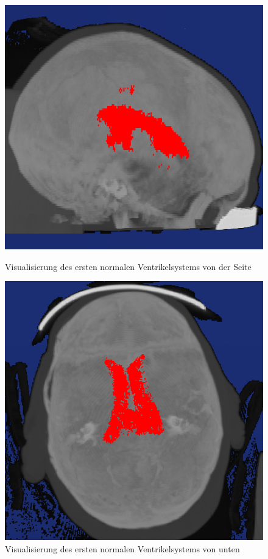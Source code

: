 \begin{figure}[H]
\begin{minipage}[b]{.5\textwidth}
  \centering
  \includegraphics[width=.9\linewidth, height=.9\linewidth]{Logos/Normal1/Seite2.PNG}
  \caption{Visualisierung des ersten normalen Ventrikelsystems von der Seite}
  \label{fig:norm1_s}
\end{minipage}%
\begin{minipage}[b]{.5\textwidth}
  \centering
  \includegraphics[width=.9\linewidth, height=.9\linewidth]{Logos/Normal1/Unten3.PNG}
  \caption{Visualisierung des ersten normalen Ventrikelsystems von unten}
  \label{fig:norm1_u}
\end{minipage}
\end{figure}

